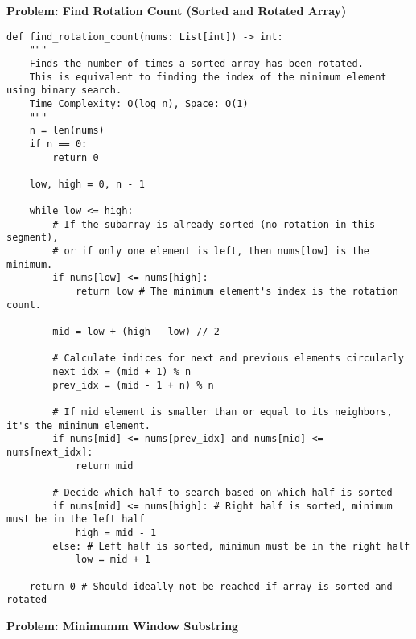 \noindent\textbf{Problem: Find Rotation Count (Sorted and Rotated Array)}
\begin{verbatim}
def find_rotation_count(nums: List[int]) -> int:
    """
    Finds the number of times a sorted array has been rotated.
    This is equivalent to finding the index of the minimum element using binary search.
    Time Complexity: O(log n), Space: O(1)
    """
    n = len(nums)
    if n == 0:
        return 0
    
    low, high = 0, n - 1
    
    while low <= high:
        # If the subarray is already sorted (no rotation in this segment),
        # or if only one element is left, then nums[low] is the minimum.
        if nums[low] <= nums[high]:
            return low # The minimum element's index is the rotation count.

        mid = low + (high - low) // 2
        
        # Calculate indices for next and previous elements circularly
        next_idx = (mid + 1) % n 
        prev_idx = (mid - 1 + n) % n 

        # If mid element is smaller than or equal to its neighbors, it's the minimum element.
        if nums[mid] <= nums[prev_idx] and nums[mid] <= nums[next_idx]:
            return mid
        
        # Decide which half to search based on which half is sorted
        if nums[mid] <= nums[high]: # Right half is sorted, minimum must be in the left half
            high = mid - 1
        else: # Left half is sorted, minimum must be in the right half
            low = mid + 1
            
    return 0 # Should ideally not be reached if array is sorted and rotated
\end{verbatim}
\noindent\textbf{Problem: Minimumm Window Substring }
